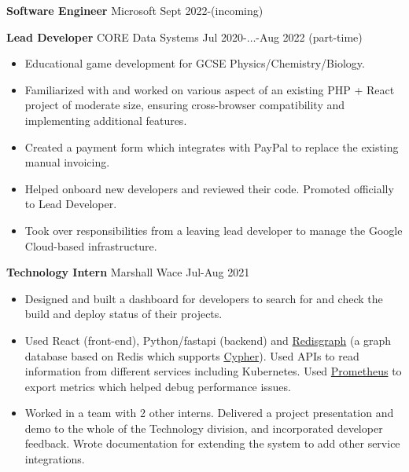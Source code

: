   \begin{itemize}
    {%
      \item \textbf{Software Engineer} \dashdiv{} Microsoft \dashdiv{} Sept 2022-(incoming)
    }

    \item \textbf{Lead Developer} \dashdiv{} CORE Data Systems \dashdiv{} Jul 2020-$\ldots$-Aug 2022 (part-time)

    \begin{itemize}
      \item Educational game development for GCSE Physics/Chemistry/Biology.
      \item Familiarized with and worked on various aspect of an existing PHP + React project of moderate size, ensuring cross-browser compatibility and implementing additional features.
      \item Created a payment form which integrates with PayPal to replace the existing manual invoicing.
      \item Helped onboard new developers and reviewed their code. Promoted officially to Lead Developer.
      \item Took over responsibilities from a leaving lead developer to manage the Google Cloud-based infrastructure.
    \end{itemize}

    \item \textbf{Technology Intern} \dashdiv{} Marshall Wace \dashdiv{} Jul-Aug 2021

    \begin{itemize}
      \item Designed and built a dashboard for developers to search for and check the build and deploy status of their projects.
      \item Used React (front-end), Python/fastapi (backend) and \href{https://oss.redis.com/redisgraph/}{\color{link}Redisgraph} (a graph database based on Redis which supports \href{https://neo4j.com/developer/cypher/}{\color{link}Cypher}). Used APIs to read information from different services including Kubernetes. Used \href{https://prometheus.io/}{\color{link}Prometheus} to export metrics which helped debug performance issues.
      \item Worked in a team with 2 other interns. Delivered a project presentation and demo to the whole of the Technology division, and incorporated developer feedback. Wrote documentation for extending the system to add other service integrations.
    \end{itemize}

  \end{itemize}

